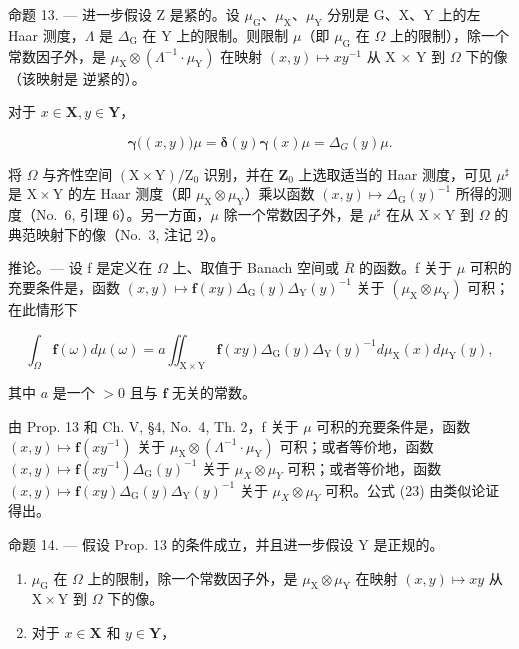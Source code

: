 命题 13. --- 进一步假设 Z 是紧的。设 \(\mu_{\mathrm{G}}\)、\(\mu_{\mathrm{X}}\)、\(\mu_{\mathrm{Y}}\) 分别是 G、X、Y 上的左 Haar 测度，\(\Lambda\) 是 \(\Delta_{\mathrm{G}}\) 在 Y 上的限制。则限制 \(\mu\)（即 \(\mu_{\mathrm{G}}\) 在 \(\Omega\) 上的限制），除一个常数因子外，是 \(\mu_{\mathrm{X}} \otimes (\Lambda^{-1} \cdot \mu_{\mathrm{Y}})\) 在映射 \((x, y) \mapsto xy^{-1}\) 从 X × Y 到 \(\Omega\) 下的像（该映射是 逆紧的）。

对于 \(x\in \mathbf{X},y\in \mathbf{Y}\)，

\[
\boldsymbol {\gamma} \big ((x, y) \big) \mu = \boldsymbol {\delta} (y) \boldsymbol {\gamma} (x) \mu = \Delta_ {G} (y) \mu .
\]

将 \(\Omega\) 与齐性空间 \((\mathrm{X} \times \mathrm{Y}) / \mathrm{Z}_0\) 识别，并在 \(\mathbf{Z}_0\) 上选取适当的 Haar 测度，可见 \(\mu^\sharp\) 是 \(\mathrm{X} \times \mathrm{Y}\) 的左 Haar 测度（即 \(\mu_{\mathrm{X}} \otimes \mu_{\mathrm{Y}}\)）乘以函数 \((x, y) \mapsto \Delta_{\mathrm{G}}(y)^{-1}\) 所得的测度（No.~6, 引理 6）。另一方面，\(\mu\) 除一个常数因子外，是 \(\mu^\sharp\) 在从 \(\mathrm{X} \times \mathrm{Y}\) 到 \(\Omega\) 的典范映射下的像（No.~3, 注记 2）。

推论。--- 设 f 是定义在 \(\Omega\) 上、取值于 Banach 空间或 \(\overline{R}\) 的函数。f 关于 \(\mu\) 可积的充要条件是，函数 \((x,y)\mapsto\mathbf{f}(xy)\Delta_{\mathrm{G}}(y)\Delta_{\mathrm{Y}}(y)^{-1}\) 关于 \((\mu_{\mathrm{X}}\otimes\mu_{\mathrm{Y}})\) 可积；在此情形下

\[
\int_ {\Omega} \mathbf {f} (\omega) d \mu (\omega) = a \iint_ {\mathrm{X} \times \mathrm{Y}} \mathbf {f} (x y) \Delta_ {\mathrm{G}} (y) \Delta_ {\mathrm{Y}} (y) ^ {- 1} d \mu_ {\mathrm{X}} (x) d \mu_ {\mathrm{Y}} (y),\tag{23}
\]

其中 \(a\) 是一个 \(>0\) 且与 \(\mathbf{f}\) 无关的常数。

由 Prop. 13 和 Ch. V, §4, No.~4, Th. 2，f 关于 \(\mu\) 可积的充要条件是，函数 \((x,y)\mapsto\mathbf{f}(xy^{-1})\) 关于 \(\mu_{\mathrm{X}}\otimes(\Lambda^{-1}\cdot\mu_{\mathrm{Y}})\) 可积；或者等价地，函数 \((x,y)\mapsto\mathbf{f}(xy^{-1})\Delta_{\mathrm{G}}(y)^{-1}\) 关于 \(\mu_{X}\otimes\mu_{Y}\) 可积；或者等价地，函数 \((x,y)\mapsto\mathbf{f}(xy)\Delta_{\mathrm{G}}(y)\Delta_{\mathrm{Y}}(y)^{-1}\) 关于 \(\mu_{X}\otimes\mu_{Y}\) 可积。公式 (23) 由类似论证得出。

命题 14. --- 假设 Prop. 13 的条件成立，并且进一步假设 Y 是正规的。

\begin{enumerate}
\def\labelenumi{\alph{enumi})}
\item
  \(\mu_{\mathrm{G}}\) 在 \(\Omega\) 上的限制，除一个常数因子外，是 \(\mu_{\mathrm{X}} \otimes \mu_{\mathrm{Y}}\) 在映射 \((x,y) \mapsto xy\) 从 \(\mathrm{X} \times \mathrm{Y}\) 到 \(\Omega\) 下的像。
\item
  对于 \(x \in \mathbf{X}\) 和 \(y \in \mathbf{Y}\)，
\end{enumerate}

